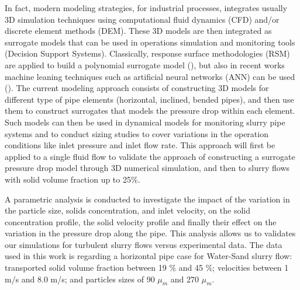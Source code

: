 \documentclass[review,3p,times,12pt]{elsarticle}
\begin{document}
In fact,  modern modeling strategies, for industrial processes, integrates usually 3D simulation techniques using computational fluid dynamics (CFD) and/or discrete element methods (DEM). These 3D models are then integrated as surrogate models that can be used in operations simulation and monitoring tools (Decision Support Systems). Classically, response surface methodologies (RSM) are applied to build a polynomial surrogate model (\citet{Rabhi}), but also in recent works machine leaning techniques such as artificial neural networks (ANN) can be used (\citet{Seong}). The current modeling approach consists of  constructing 3D models for different type of pipe elements (horizontal, inclined, bended pipes), and then use them to construct surrogates that models the pressure drop within each element. Such models can then be used in dynamical models for monitoring slurry pipe systems and to conduct sizing studies to cover variations in the operation conditions like inlet pressure and inlet flow rate. This approach will first be applied to a single fluid flow to validate the approach of constructing a surrogate pressure drop model through 3D numerical simulation, and then to slurry flows with solid volume fraction up to 25\%. %

A parametric analysis is conducted to investigate the impact of the variation in the particle size, solids concentration, and inlet velocity, on the solid concentration profile, the solid velocity profile and finally their effect on the variation in the pressure drop along the pipe. This analysis allows us to validates our simulations for turbulent slurry flows versus experimental data. The data used in this work is regarding a horizontal pipe case for Water-Sand slurry flow: transported solid volume fraction between 19  $\%$ and 45 $\%$; velocities between 1 m/s and 8.0 m/s; and particles sizes of 90 $\mu_m$ and 270 $\mu_m$. 





\end{document}
